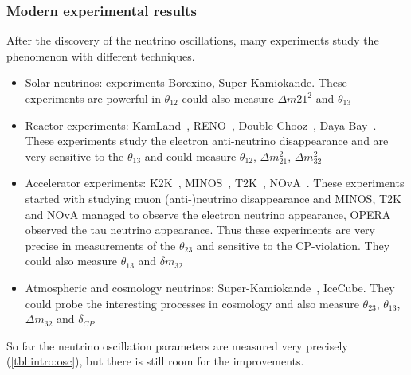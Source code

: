 \documentclass[../main.tex]{subfiles}
\begin{document}
\subsubsection{Modern experimental results}
After the discovery of the neutrino oscillations, many experiments study the phenomenon with different techniques.
\begin{itemize}
  \item Solar neutrinos: experiments Borexino, Super-Kamiokande. These experiments are powerful in $\theta_{12}$ could also measure $\Delta m{21}^2$ and $\theta_{13}$
  \item Reactor experiments: KamLand~\cite{Eguchi2003}, RENO~\cite{Ahn2012}, Double Chooz~\cite{Abe2014}, Daya Bay~\cite{An2014}. These experiments study the electron anti-neutrino disappearance and are very sensitive to the $\theta_{13}$ and could measure $\theta_{12}$, $\Delta m_{21}^2$, $\Delta m_{32}^2$
  \item Accelerator experiments: K2K~\cite{Ahn2006}, MINOS~\cite{Adamson2014}, T2K~\cite{Abe2020a}, NOvA~\cite{Acero2019}. These experiments started with studying muon (anti-)neutrino disappearance and MINOS, T2K and NOvA managed to observe the electron neutrino appearance, OPERA observed the tau neutrino appearance. Thus these experiments are very precise in measurements of the $\theta_{23}$ and sensitive to the CP-violation. They could also measure $\theta_{13}$ and $\delta m_{32}$
  \item Atmospheric and cosmology neutrinos: Super-Kamiokande~\cite{Jiang2019}, IceCube. They could probe the interesting processes in cosmology and also measure $\theta_{23}$, $\theta_{13}$, $\Delta m_{32}$ and $\delta_{CP}$
\end{itemize}

So far the neutrino oscillation parameters are measured very precisely (\autoref{tbl:intro:osc}), but there is still room for the improvements.
\end{document}
